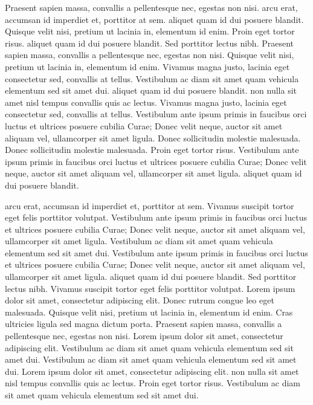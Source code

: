 \documentclass{article}
\begin{document}
Praesent sapien massa, convallis a pellentesque nec, egestas non nisi.  arcu erat, accumsan id imperdiet et, porttitor at sem.  aliquet quam id dui posuere blandit. Quisque velit nisi, pretium ut lacinia in, elementum id enim. Proin eget tortor risus.  aliquet quam id dui posuere blandit. Sed porttitor lectus nibh. Praesent sapien massa, convallis a pellentesque nec, egestas non nisi. Quisque velit nisi, pretium ut lacinia in, elementum id enim. Vivamus magna justo, lacinia eget consectetur sed, convallis at tellus. Vestibulum ac diam sit amet quam vehicula elementum sed sit amet dui.  aliquet quam id dui posuere blandit.  non nulla sit amet nisl tempus convallis quis ac lectus. Vivamus magna justo, lacinia eget consectetur sed, convallis at tellus. Vestibulum ante ipsum primis in faucibus orci luctus et ultrices posuere cubilia Curae; Donec velit neque, auctor sit amet aliquam vel, ullamcorper sit amet ligula. Donec sollicitudin molestie malesuada.\stopmsdata\  Donec sollicitudin molestie malesuada. Proin eget tortor risus. Vestibulum ante ipsum primis in faucibus orci luctus et ultrices posuere cubilia Curae; Donec velit neque, auctor sit amet aliquam vel, ullamcorper sit amet ligula.  aliquet quam id dui posuere blandit.

 arcu erat, accumsan id imperdiet et, porttitor at sem. Vivamus suscipit tortor eget felis porttitor volutpat. Vestibulum ante ipsum primis in faucibus orci luctus et ultrices posuere cubilia Curae; Donec velit neque, auctor sit amet aliquam vel, ullamcorper sit amet ligula. Vestibulum ac diam sit amet quam vehicula elementum sed sit amet dui. Vestibulum ante ipsum primis in faucibus orci luctus et ultrices posuere cubilia Curae; Donec velit neque, auctor sit amet aliquam vel, ullamcorper sit amet ligula.  aliquet quam id dui posuere blandit. Sed porttitor lectus nibh. Vivamus suscipit tortor eget felis porttitor volutpat. Lorem ipsum dolor sit amet, consectetur adipiscing elit. Donec rutrum congue leo eget malesuada. Quisque velit nisi, pretium ut lacinia in, elementum id enim. Cras ultricies ligula sed magna dictum porta. Praesent sapien massa, convallis a pellentesque nec, egestas non nisi. Lorem ipsum dolor sit amet, consectetur adipiscing elit. Vestibulum ac diam sit amet quam vehicula elementum sed sit amet dui. Vestibulum ac diam sit amet quam vehicula elementum sed sit amet dui. Lorem ipsum dolor sit amet, consectetur adipiscing elit.  non nulla sit amet nisl tempus convallis quis ac lectus. Proin eget tortor risus. Vestibulum ac diam sit amet quam vehicula elementum sed sit amet dui.
\end{document}
